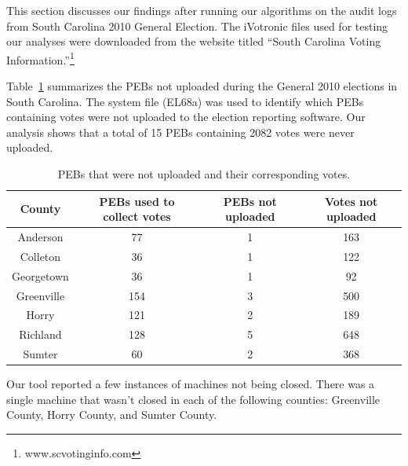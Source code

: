 \smvertspace
This section discusses our findings after running our algorithms on
the audit logs from South Carolina 2010 General Election.  The iVotronic
files used for testing our analyses were downloaded from the website
titled \textquotedblleft South Carolina Voting
Information.\textquotedblright \footnote{www.scvotinginfo.com} 

\smvertspace
Table~\ref{tab:pebs} summarizes the PEBs not uploaded during the
General 2010 elections in South Carolina. The system file (EL68a) was
used to identify which PEBs containing votes were not uploaded to the
election reporting software. Our analysis shows that a total of 15
PEBs containing 2082 votes were never uploaded.

\begin{table}[t]
    \begin{center}
    \caption{PEBs that were not uploaded and their corresponding votes.}
    \begin{tabular}{| c | c | c | c |}
    \hline                   
    County &PEBs used to collect votes &PEBs not uploaded &Votes not uploaded\\
    \hline
    Anderson &77 &1 &163\\
    \hline
    Colleton &36 &1 &122\\
    \hline
    Georgetown &36 &1 &92\\
    \hline
    Greenville &154 &3 &500\\
    \hline
    Horry &121 &2 &189\\
    \hline
    Richland &128 &5 &648\\
    \hline
    Sumter &60 &2 &368\\
    \hline
    \end{tabular}
    \end{center}
    \label{tab:pebs}
\end{table}

Our tool reported a few instances of machines not being closed.  There was a single machine that wasn't closed in each of the following counties: Greenville County, Horry County, and Sumter County.  


